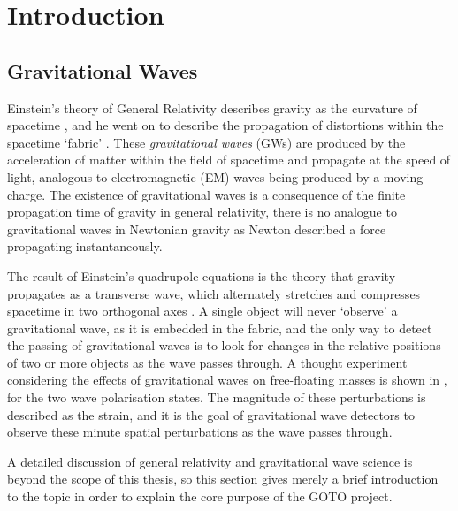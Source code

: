 \chapter{Introduction}
\label{chap:intro}
\chaptoc{}


\newpage
\section{Gravitational Waves}
\label{sec:gw}
\begin{colsection}


\begin{colsection}

Einstein's theory of General Relativity describes gravity as the curvature of spacetime \citep{Einstein1914}, and he went on to describe the propagation of distortions within the spacetime `fabric' \citep{Einstein1916}. These \emph{gravitational waves} (GWs)  are produced by the acceleration of matter within the field of spacetime and propagate at the speed of light, analogous to electromagnetic (EM)  waves being produced by a moving charge. The existence of gravitational waves is a consequence of the finite propagation time of gravity in general relativity, there is no analogue to gravitational waves in Newtonian gravity as Newton described a force propagating instantaneously.

The result of Einstein's quadrupole equations is the theory that gravity propagates as a transverse wave, which alternately stretches and compresses spacetime in two orthogonal axes \citep{BIGcardiff}. A single object will never `observe' a gravitational wave, as it is embedded in the fabric, and the only way to detect the passing of gravitational waves is to look for changes in the relative positions of two or more objects as the wave passes through. A thought experiment considering the effects of gravitational waves on free-floating masses is shown in , for the two wave polarisation states. The magnitude of these perturbations is described as the strain, and it is the goal of gravitational wave detectors to observe these minute spatial perturbations as the wave passes through.

A detailed discussion of general relativity and gravitational wave science is beyond the scope of this thesis, so this section gives merely a brief introduction to the topic in order to explain the core purpose of the GOTO project.


\end{colsection}
\end{colsection}
